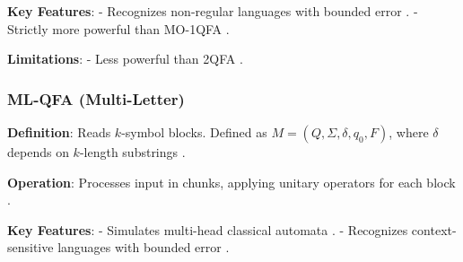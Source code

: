 \textbf{Key Features}:
- Recognizes non-regular languages with bounded error \cite{kondacs1997power}.
- Strictly more powerful than MO-1QFA \cite{kondacs1997power}.

\textbf{Limitations}: 
- Less powerful than 2QFA \cite{kondacs1997power}.

\subsubsection{ML-QFA (Multi-Letter)}
\label{sssec:ml-qfa}

\textbf{Definition}: Reads \( k \)-symbol blocks. Defined as \( M = (Q, \Sigma, \delta, q_0, F) \), where \( \delta \) depends on \( k \)-length substrings \cite{belovs2007multi}.

\textbf{Operation}: Processes input in chunks, applying unitary operators for each block \cite{belovs2007multi}.

\textbf{Key Features}:
- Simulates multi-head classical automata \cite{belovs2007multi}.
- Recognizes context-sensitive languages with bounded error \cite{belovs2007multi}.

